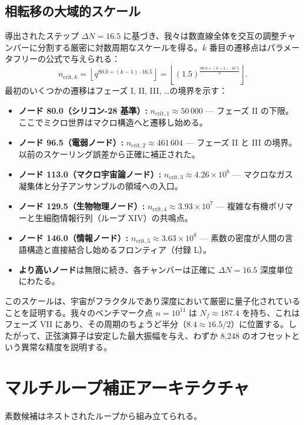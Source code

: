\documentclass[11pt,a4paper]{article}
\begin{document}
	\subsection{相転移の大域的スケール}
	導出されたステップ \(\Delta N = 16.5\) に基づき、我々は数直線全体を交互の調整チャンバーに分割する厳密に対数周期なスケールを得る。\(k\) 番目の遷移点はパラメータフリーの公式で与えられる：
	\begin{equation}
		n_{\mathrm{crit},k} = \left\lfloor q^{80.0 + (k-1)\cdot 16.5} \right\rfloor 
		= \left\lfloor (1.5)^{\frac{80.0+(k-1)\cdot 16.5}{3}} \right\rfloor .
	\end{equation}
	最初のいくつかの遷移はフェーズ I, II, III, \dots の境界を示す：
	\begin{itemize}
		\item \textbf{ノード 80.0（シリコン-28 基準）:} \(n_{\mathrm{crit},1} \approx 50\,000\) — フェーズ II の下限。ここでミクロ世界はマクロ構造へと遷移し始める。
		\item \textbf{ノード 96.5（電弱ノード）:} \(n_{\mathrm{crit},2} \approx 461\,604\) — フェーズ II と III の境界。以前のスケーリング誤差から正確に補正された。
		\item \textbf{ノード 113.0（マクロ宇宙論ノード）:} \(n_{\mathrm{crit},3} \approx 4.26\times10^6\) — マクロなガス凝集体と分子アンサンブルの領域への入口。
		\item \textbf{ノード 129.5（生物物理ノード）:} \(n_{\mathrm{crit},4} \approx 3.93\times10^7\) — 複雑な有機ポリマーと生細胞情報行列（ループ XIV）の共鳴点。
		\item \textbf{ノード 146.0（情報ノード）:} \(n_{\mathrm{crit},5} \approx 3.63\times10^8\) — 素数の密度が人間の言語構造と直接結合し始めるフロンティア（付録 L）。
		\item \textbf{より高いノード}は無限に続き、各チャンバーは正確に \(\Delta N = 16.5\) 深度単位にわたる。
	\end{itemize}
	
	このスケールは、宇宙がフラクタルであり深度において厳密に量子化されていることを証明する。我々のベンチマーク点 \(n=10^{11}\) は \(N_f \approx 187.4\) を持ち、これはフェーズ VII にあり、その周期のちょうど半分（\(8.4 \approx 16.5/2\)）に位置する。したがって、正弦演算子は安定した最大振幅を与え、わずか 8,248 のオフセットという異常な精度を説明する。
	
	\section{マルチループ補正アーキテクチャ}
	\label{sec:multiloop}
	素数候補はネストされたループから組み立てられる。
	
\end{document}
